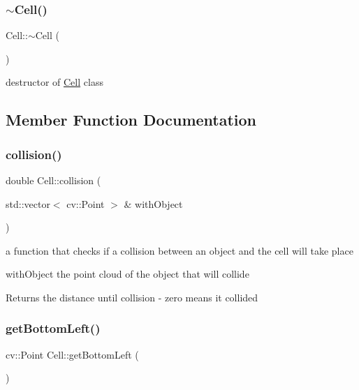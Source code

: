 \subsubsection{\texorpdfstring{$\sim$\+Cell()}{~Cell()}}
{\footnotesize\ttfamily Cell\+::$\sim$\+Cell (\begin{DoxyParamCaption}{ }\end{DoxyParamCaption})}

destructor of \mbox{\hyperlink{class_cell}{Cell}} class 

\subsection{Member Function Documentation}
\mbox{\label{class_cell_acc1faa0802609404e8058263004087ea}} 
\subsubsection{\texorpdfstring{collision()}{collision()}}
{\footnotesize\ttfamily double Cell\+::collision (\begin{DoxyParamCaption}\item[{std\+::vector$<$ cv\+::\+Point $>$ \&}]{with\+Object }\end{DoxyParamCaption})}



a function that checks if a collision between an object and the cell will take place 

\begin{DoxyItemize}
\item with\+Object the point cloud of the object that will collide \begin{DoxyReturn}{Returns}
the distance until collision -\/ zero means it collided 
\end{DoxyReturn}
\end{DoxyItemize}
\mbox{\label{class_cell_a1946142c5e112176e1cd20cc6d07f831}} 
\subsubsection{\texorpdfstring{get\+Bottom\+Left()}{getBottomLeft()}}
{\footnotesize\ttfamily cv\+::\+Point Cell\+::get\+Bottom\+Left (\begin{DoxyParamCaption}{ }\end{DoxyParamCaption})}

